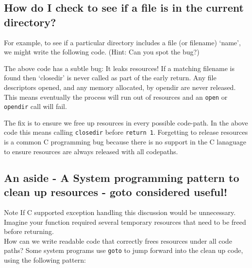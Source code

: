 \subsection{How do I check to see if a file is in the current
directory?}\label{how-do-i-check-to-see-if-a-file-is-in-the-current-directory}

For example, to see if a particular directory includes a file (or
filename) `name', we might write the following code. (Hint: Can you spot
the bug?)

\begin{Shaded}
\begin{Highlighting}[]
   
     
     
         
         \NormalTok{; }
        \NormalTok{\}}
    \NormalTok{\}}
     \NormalTok{; }
\NormalTok{\}}
\end{Highlighting}
\end{Shaded}

The above code has a subtle bug: It leaks resources! If a matching
filename is found then `closedir' is never called as part of the early
return. Any file descriptors opened, and any memory allocated, by
opendir are never released. This means eventually the process will run
out of resources and an \texttt{open} or \texttt{opendir} call will
fail.

The fix is to ensure we free up resources in every possible code-path.
In the above code this means calling \texttt{closedir} before
\texttt{return\ 1}. Forgetting to release resources is a common C
programming bug because there is no support in the C lanaguage to ensure
resources are always released with all codepaths.

\subsection{An aside - A System programming pattern to clean up
resources - goto considered
useful!}\label{an-aside---a-system-programming-pattern-to-clean-up-resources---goto-considered-useful}

Note If C supported exception handling this discussion would be
unnecessary.\\Imagine your function required several temporary resources
that need to be freed before returning.\\How can we write readable code
that correctly frees resources under all code paths? Some system
programs use \texttt{goto} to jump forward into the clean up code, using
the following pattern:

